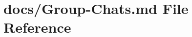 \hypertarget{_group-_chats_8md}{\section{docs/\+Group-\/\+Chats.md File Reference}
\label{_group-_chats_8md}
}
